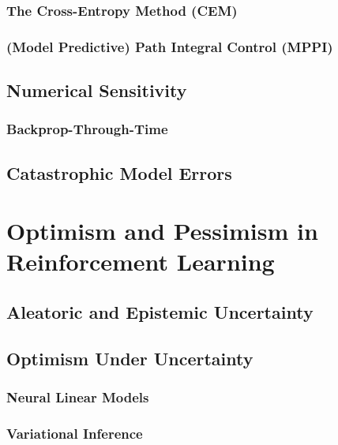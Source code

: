 			\subsubsection{The Cross-Entropy Method (CEM)} %

			\subsubsection{(Model Predictive) Path Integral Control (MPPI)} %

		\subsection{Numerical Sensitivity} %

			\subsubsection{Backprop-Through-Time} %

		\subsection{Catastrophic Model Errors} %

	\section{Optimism and Pessimism in Reinforcement Learning} %

		\subsection{Aleatoric and Epistemic Uncertainty} %

		\subsection{Optimism Under Uncertainty} %

			\subsubsection{Neural Linear Models} %

			\subsubsection{Variational Inference} %

